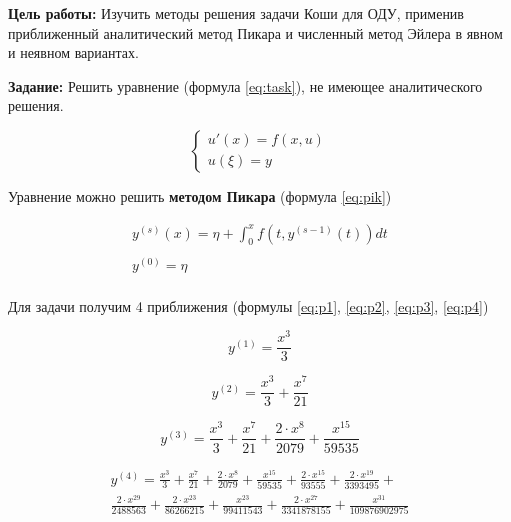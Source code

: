 
\textbf{Цель работы:} Изучить методы решения задачи Коши для ОДУ,
применив приближенный аналитический метод Пикара и численный метод
Эйлера в явном и неявном вариантах.

\textbf{Задание:} Решить уравнение (формула \ref{eq:task}),
не имеющее аналитического решения.

\begin{equation}\label{eq:task}
    \begin{cases}
        u'(x) = f(x,u) \\
        u(\xi) = y
    \end{cases}
\end{equation}

Уравнение можно решить \textbf{методом Пикара} (формула \ref{eq:pik})

\begin{equation}\label{eq:pik}
    \begin{matrix}
        y^{(s)}(x) = \eta + \int_0^x f(t, y^{(s-1)}(t)) dt \\
        \\
        y^{(0)} = \eta \\
    \end{matrix}
\end{equation}

Для задачи получим 4 приближения (формулы \ref{eq:p1}, \ref{eq:p2},
\ref{eq:p3}, \ref{eq:p4})

\begin{equation}\label{eq:p1}
    y^{(1)} = \frac{x^3}{3}
\end{equation}

\begin{equation}\label{eq:p2}
    y^{(2)} = \frac{x^3}{3} + \frac{x^7}{21}
\end{equation}

\begin{equation}\label{eq:p3}
    y^{(3)} = \frac{x^3}{3} + \frac{x^7}{21} + \frac{2 \cdot x^8}{2079}
    + \frac{x^{15}}{59535}
\end{equation}

\begin{multline}\label{eq:p4}
        y^{(4)} = \frac{x^3}{3} + \frac{x^7}{21} +
        \frac{2 \cdot x^8}{2079} +
        \frac{x^{15}}{59535} +
        \frac{2 \cdot x^{15}}{93555} +
        \frac{2 \cdot x^{19}}{3393495} + \\
        \frac{2 \cdot x^{29}}{2488563} +
        \frac{2 \cdot x^{23}}{86266215} +
        \frac{x^{23}}{99411543} +
        \frac{2 \cdot x^{27}}{3341878155} +
        \frac{x^{31}}{109876902975}
\end{multline}

